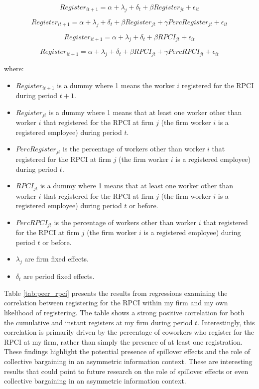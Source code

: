 \documentclass[10pt, oneside]{book}
\begin{document}
\begin{equation}
Register_{it+1} = \alpha + \lambda_j + \delta_t + \beta Register_{jt} + \epsilon_{it}
\end{equation}

\begin{equation}
Register_{it+1} = \alpha + \lambda_j + \delta_t + \beta Register_{jt} + \gamma Perc Register_{jt} + \epsilon_{it}
\end{equation}

\begin{equation}
Register_{it+1} = \alpha + \lambda_j + \delta_t + \beta RPCI_{jt} + \epsilon_{it}
\end{equation}

\begin{equation}
Register_{it+1} = \alpha + \lambda_j + \delta_t + \beta RPCI_{jt} + \gamma Perc RPCI_{jt} + \epsilon_{it}
\end{equation}

where:

\begin{itemize}
    \item $Register_{it+1}$ is a dummy where 1 means the worker $i$ registered for the RPCI during period $t+1$.
    \item $Register_{jt}$ is a dummy where 1 means that at least one worker other than worker $i$ that registered for the RPCI at firm $j$ (the firm worker $i$ is a registered employee) during period $t$.
    \item $PercRegister_{jt}$ is the percentage of workers other than worker $i$ that registered for the RPCI at firm $j$ (the firm worker $i$ is a registered employee) during period $t$.
    \item $RPCI_{jt}$ is a dummy where 1 means that at least one worker other than worker $i$ that registered for the RPCI at firm $j$ (the firm worker $i$ is a registered employee) during period $t$ or before.
    \item $PercRPCI_{jt}$ is the percentage of workers other than worker $i$ that registered for the RPCI at firm $j$ (the firm worker $i$ is a registered employee) during period $t$ or before.
    \item $\lambda_j$ are firm fixed effects.
    \item $\delta_t$ are period fixed effects.
\end{itemize}

Table \ref{tab:peer_rpci} presents the results from regressions examining the correlation between registering for the RPCI within my firm and my own likelihood of registering. The table shows a strong positive correlation for both the cumulative and instant registers at my firm during period $t$. Interestingly, this correlation is primarily driven by the percentage of coworkers who register for the RPCI at my firm, rather than simply the presence of at least one registration. These findings highlight the potential presence of spillover effects and the role of collective bargaining in an asymmetric information context. These are interesting results that could point to future research on the role of spillover effects or even collective bargaining in an asymmetric information context. \\
\end{document}
